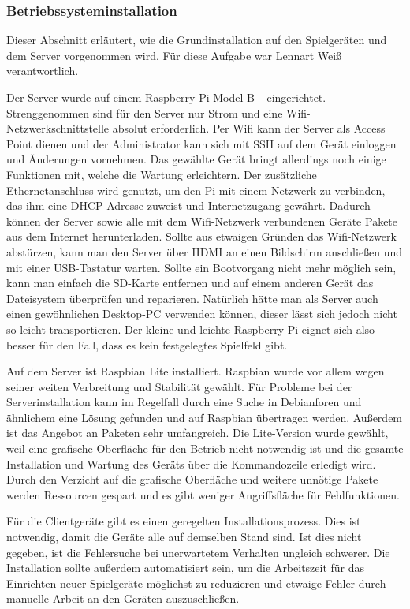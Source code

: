\subsubsection{Betriebssysteminstallation}
\label{sec:betriebssysteminstallation}

Dieser Abschnitt erläutert, wie die Grundinstallation auf den Spielgeräten und dem Server
vorgenommen wird.
Für diese Aufgabe war Lennart Weiß verantwortlich.

Der Server wurde auf einem Raspberry Pi Model B+ eingerichtet. Strenggenommen
sind für den Server nur Strom und eine Wifi-Netzwerkschnittstelle absolut erforderlich. Per
Wifi kann der Server als Access Point dienen und der Administrator kann sich mit
SSH auf dem Gerät einloggen und Änderungen vornehmen. Das gewählte Gerät bringt
allerdings noch einige Funktionen mit, welche die Wartung erleichtern. Der
zusätzliche Ethernetanschluss wird genutzt, um den Pi mit einem Netzwerk zu
verbinden, das ihm eine DHCP-Adresse zuweist und Internetzugang gewährt. 
Dadurch können der Server sowie alle mit dem Wifi-Netzwerk verbundenen Geräte
Pakete aus dem Internet herunterladen. Sollte aus etwaigen Gründen das Wifi-Netzwerk
abstürzen, kann man den Server über HDMI an einen Bildschirm
anschließen und mit einer USB-Tastatur warten. Sollte ein Bootvorgang nicht
mehr möglich sein, kann man einfach die SD-Karte entfernen und auf einem anderen
Gerät das Dateisystem überprüfen und reparieren. Natürlich hätte man als Server
auch einen gewöhnlichen Desktop-PC verwenden können, dieser lässt sich jedoch
nicht so leicht transportieren. Der kleine und leichte Raspberry Pi eignet sich
also besser für den Fall, dass es kein festgelegtes Spielfeld gibt.

Auf dem Server ist Raspbian Lite installiert. Raspbian wurde vor allem wegen 
seiner weiten Verbreitung und Stabilität gewählt. Für Probleme bei der 
Serverinstallation kann im Regelfall durch eine Suche in Debianforen und ähnlichem
eine Lösung gefunden und auf Raspbian übertragen werden. Außerdem ist das
Angebot an Paketen sehr umfangreich. Die Lite-Version wurde gewählt, weil eine
grafische Oberfläche für den Betrieb nicht notwendig ist und die gesamte
Installation und Wartung des Geräts über die Kommandozeile erledigt wird.
Durch den Verzicht auf die grafische Oberfläche und weitere unnötige Pakete
werden Ressourcen gespart und es gibt weniger Angriffsfläche für Fehlfunktionen.

Für die Clientgeräte gibt es einen geregelten Installationsprozess. Dies ist
notwendig, damit die Geräte alle auf demselben Stand sind. Ist dies nicht
gegeben, ist die Fehlersuche bei unerwartetem Verhalten ungleich schwerer. Die
Installation sollte außerdem automatisiert sein, um die Arbeitszeit für das
Einrichten neuer Spielgeräte möglichst zu reduzieren und etwaige Fehler durch
manuelle Arbeit an den Geräten auszuschließen.

